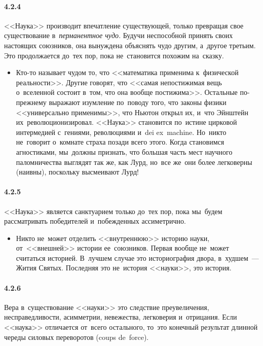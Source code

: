 \paragraph{4.2.4}\hypertarget{par:4.2.4}{} <<Наука>> производит впечатление существующей, только превращая свое существование в~{\itshape перманентное чудо}. Будучи неспособной принять своих настоящих союзников, она вынуждена объяснять чудо другим, а~другое третьим. Это продолжается до~тех пор, пока не~становится похожим на~сказку. 
	\begin{itemize}
	\item 
	Кто-то называет чудом то, что <<математика применима к~физической реальности>>. Другие говорят, что <<самая непостижимая вещь о~вселенной состоит в~том, что она вообще постижима>>. Остальные по-прежнему выражают изумление по~поводу того, что законы физики <<универсально применимы>>, что Ньютон открыл их, и~что Эйнштейн их~революционизировал. <<Наука>> становится по~истине цирковой интермедией с~гениями, революциями и~dei ex~machine. Но~никто не~говорит о~комнате страха позади всего этого. Когда становимся агностиками, мы~должны признать, что большая часть мест научного паломничества выглядят так же, как Лурд, но~все же~они более легковерны (наивны), поскольку высмеивают Лурд!
	\end{itemize}	

\paragraph{4.2.5}\hypertarget{par:4.2.5}{} <<Наука>> является санктуарием только до~тех пор, пока мы~будем рассматривать победителей и~побежденных ассиметрично. 
	\begin{itemize}
	\item 
	Никто не~может отделить <<внутреннюю>> историю науки, от~<<внешней>> истории ее~союзников. Первая вообще не~может считаться историей. В~лучшем случае это историография двора, в~худшем~--- Жития Святых. Последняя это не~история <<науки>>, это история.
	\end{itemize}


\paragraph{4.2.6}\hypertarget{par:4.2.6}{} Вера в~существование <<науки>> это следствие преувеличения, несправедливости, асимметрии, невежества, легковерия и~отрицания. Если <<наука>> отличается от~всего остального, то~это конечный результат длинной череды силовых переворотов (coups de~force).


